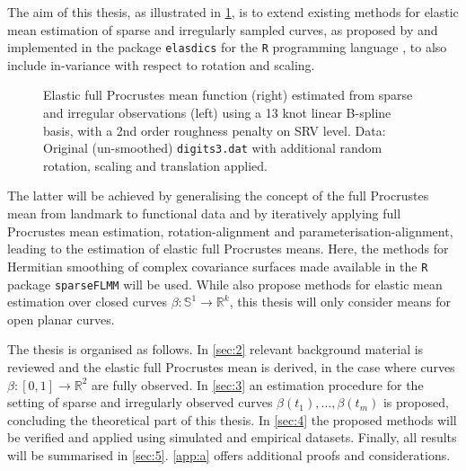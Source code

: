 The aim of this thesis, as illustrated in \cref{fig:1-mean}, is to extend existing methods for elastic mean estimation of sparse and irregularly sampled curves, as proposed by \cite{Steyer2021} and implemented in the package \texttt{elasdics} \parencite{elasdics} for the \texttt{R} programming language \parencite{R}, to also include in-variance with respect to rotation and scaling.
\begin{figure}
  \centering
  \begin{subfigure}{.48\textwidth}
    \centering
  \end{subfigure}\hfill%
  \begin{subfigure}{.48\textwidth}
    \centering
  \end{subfigure}
  \caption{Elastic full Procrustes mean function (right) estimated from sparse and irregular observations (left) using a 13 knot linear B-spline basis, with a 2nd order roughness penalty on SRV level. Data: Original (un-smoothed) \texttt{digits3.dat} with additional random rotation, scaling and translation applied.}
  \label{fig:1-mean}
\end{figure}
The latter will be achieved by generalising the concept of the full Procrustes mean from landmark to functional data and by iteratively applying full Procrustes mean estimation, rotation-alignment and parameterisation-alignment, leading to the estimation of elastic full Procrustes means.
Here, the methods for Hermitian smoothing of complex covariance surfaces made available in the \texttt{R} package \texttt{sparseFLMM} \parencite{sparseFLMM} will be used.
While \citeauthor{Steyer2021} also propose methods for elastic mean estimation over closed curves $\beta:\mathbb{S}^1 \rightarrow \mathbb{R}^k$, this thesis will only consider means for open planar curves. 

The thesis is organised as follows.
In \cref{sec:2} relevant background material is reviewed and the elastic full Procrustes mean is derived, in the case where curves $\beta:[0,1] \rightarrow \mathbb{R}^2$ are fully observed. 
In \cref{sec:3} an estimation procedure for the setting of sparse and irregularly observed curves $\beta(t_1), \dots, \beta(t_m)$ is proposed, concluding the theoretical part of this thesis.
In \cref{sec:4} the proposed methods will be verified and applied using simulated and empirical datasets.
Finally, all results will be summarised in \cref{sec:5}.
\cref{app:a} offers additional proofs and considerations.
